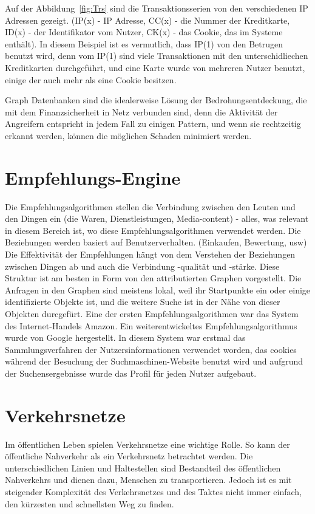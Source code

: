 Auf der Abbildung~\ref{fig:Trs} sind die Transaktionsserien von den verschiedenen IP Adressen gezeigt. (IP(x) - IP Adresse, CC(x) - die Nummer der Kreditkarte, ID(x) - der Identifikator vom Nutzer, CK(x) - das Cookie, das im Systeme enthält). In diesem Beispiel ist es vermutlich, dass IP(1) von den Betrugen benutzt wird, denn vom IP(1) sind viele Transaktionen mit den unterschidliechen Kreditkarten durchgeführt, und eine Karte wurde von mehreren Nutzer benutzt, einige der auch mehr als eine Cookie besitzen. 

Graph Datenbanken sind die idealerweise Lösung der Bedrohungsentdeckung, die mit dem Finanzsicherheit in Netz verbunden sind, denn die Aktivität der Angreifern entspricht in jedem Fall zu einigen Pattern, und wenn sie rechtzeitig erkannt werden, können die möglichen Schaden minimiert werden.

\section{Empfehlungs-Engine}
Die Empfehlungsalgorithmen stellen die Verbindung zwischen den Leuten und den Dingen ein (die Waren, Dienstleistungen, Media-content) - alles, was relevant in diesem Bereich ist, wo diese Empfehlungsalgorithmen verwendet werden. Die Beziehungen werden basiert auf Benutzerverhalten. (Einkaufen, Bewertung, usw)
Die Effektivität der Empfehlungen hängt von dem Verstehen der Beziehungen zwischen Dingen ab und auch die Verbindung -qualität und -stärke. Diese Struktur ist am besten in Form von den attributierten Graphen vorgestellt. Die Anfragen in den Graphen sind meistens lokal, weil ihr Startpunkte ein oder einige identifizierte Objekte ist, und die weitere Suche ist in der Nähe von dieser Objekten durcgefürt.
Eine der ersten Empfehlungsalgorithmen war das System des Internet-Handels Amazon. Ein weiterentwickeltes Empfehlungsalgorithmus wurde von Google hergestellt. In diesem System war erstmal das Sammlungsverfahren der Nutzersinformationen verwendet worden, das cookies während der Besuchung der Suchmaschinen-Website benutzt wird und aufgrund der Suchensergebnisse wurde das Profil für jeden Nutzer aufgebaut.

\section{Verkehrsnetze}
Im öffentlichen Leben spielen Verkehrsnetze eine wichtige Rolle. So kann der öffentliche Nahverkehr als ein Verkehrsnetz betrachtet werden. Die unterschiedlichen Linien und Haltestellen sind Bestandteil des öffentlichen Nahverkehrs und dienen dazu, Menschen zu transportieren. Jedoch ist es mit steigender Komplexität des Verkehrsnetzes und des Taktes nicht immer einfach, den kürzesten und schnellsten Weg zu finden.

